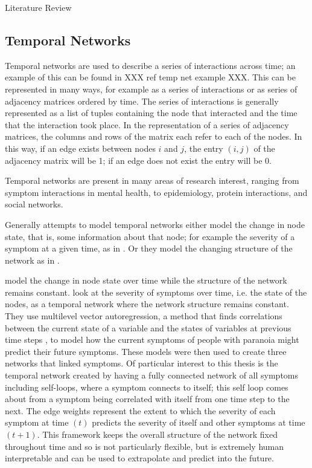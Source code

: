 \documentclass[12pt]{amsart}
\begin{document}
\begin{section}{Literature Review}

    \subsection{Temporal Networks}
        Temporal networks are used to describe a series of interactions across time; an example of this can be found in XXX ref temp net example XXX. This can be represented in many ways, for example as a series of interactions or as series of adjacency matrices ordered by time. The series of interactions is generally represented as a list of tuples containing the node that interacted and the time that the interaction took place. In the representation of a series of adjacency matrices, the columns and rows of the matrix each refer to each of the nodes. In this way, if an edge exists between nodes $i$ and $j$, the entry $(i,j)$ of the adjacency matrix will be 1; if an edge does not exist the entry will be 0.

        Temporal networks are present in many areas of research interest, ranging from symptom interactions in mental health\cite{jordan2020current,contreras2020temporal}, to epidemiology\cite{masuda2013predicting}, protein interactions\cite{lucas2021inferring,jin2009identifying}, and social networks\cite{moinet2015burstiness,hanneke2010discrete}.     
        
        Generally attempts to model temporal networks either model the change in node state, that is, some information about that node; for example the severity of a symptom at a given time, as in \cite{contreras2020temporal}. Or they model the changing structure of the network as in \cite{sanna2021link}. 

         \cite{contreras2020temporal} model the change in node state over time while the structure of the network remains constant.  look at the severity of symptoms over time, i.e. the state of the nodes, as a temporal network where the network structure remains constant. They use multilevel vector autoregression, a method that finds correlations between the current state of a variable and the states of variables at previous time steps \cite{singer2003applied}, to model how the current symptoms of people with paranoia might predict their future symptoms. These models were then used to create three networks that linked symptoms. Of particular interest to this thesis is the temporal network created by having a fully connected network of all symptoms including self-loops, where a symptom connects to itself; this self loop comes about from a symptom being correlated with itself from one time step to the next. The edge weights represent the extent to which the severity of each symptom at time $(t)$ predicts the severity of itself and other symptoms at time $(t+1)$. This framework keeps the overall structure of the network fixed throughout time and so is not particularly flexible, but is extremely human interpretable and can be used to extrapolate and predict into the future. 


\end{section}
\end{document}
